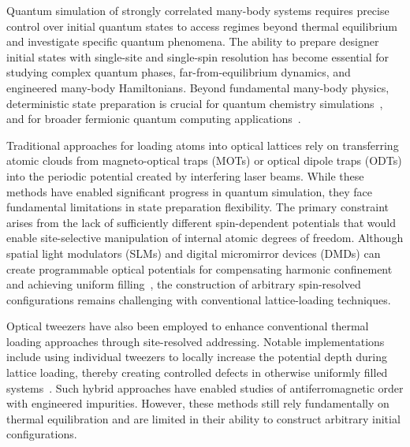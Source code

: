 

Quantum simulation of strongly correlated many-body systems requires precise control over initial quantum states to access regimes beyond thermal equilibrium and investigate specific quantum phenomena. The ability to prepare designer initial states with single-site and single-spin resolution has become essential for studying complex quantum phases, far-from-equilibrium dynamics, and engineered many-body Hamiltonians. Beyond fundamental many-body physics, deterministic state preparation is crucial for quantum chemistry simulations~\cite{gkritsis_simulating_2025}, and for broader fermionic quantum computing applications~\cite{gonzalez-cuadra_fermionic_2023}.

Traditional approaches for loading atoms into optical lattices rely on transferring atomic clouds from magneto-optical traps (MOTs) or optical dipole traps (ODTs) into the periodic potential created by interfering laser beams. While these methods have enabled significant progress in quantum simulation, they face fundamental limitations in state preparation flexibility. The primary constraint arises from the lack of sufficiently different spin-dependent potentials that would enable site-selective manipulation of internal atomic degrees of freedom. Although spatial light modulators (SLMs) and digital micromirror devices (DMDs) can create programmable optical potentials for compensating harmonic confinement and achieving uniform filling~\cite{mazurenko_cold-atom_2017}, the construction of arbitrary spin-resolved configurations remains challenging with conventional lattice-loading techniques.

Optical tweezers have also been employed to enhance conventional thermal loading approaches through site-resolved addressing. Notable implementations include using individual tweezers to locally increase the potential depth during lattice loading, thereby creating controlled defects in otherwise uniformly filled systems~\cite{koepsell_imaging_2019}. Such hybrid approaches have enabled studies of antiferromagnetic order with engineered impurities.
However, these methods still rely fundamentally on thermal equilibration and are limited in their ability to construct arbitrary initial configurations.

